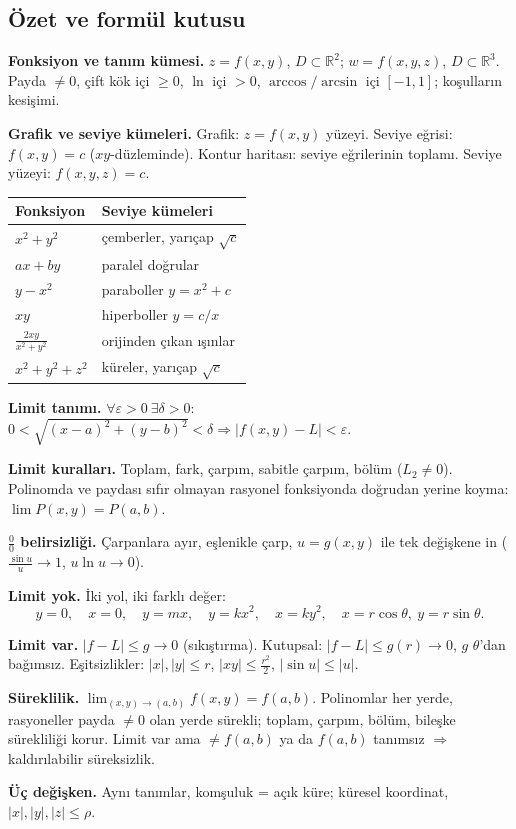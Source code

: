 \subsection{Özet ve formül kutusu}

\begin{ozet}
\textbf{Fonksiyon ve tanım kümesi.} $z=f(x,y)$, $D\subset\mathbb R^2$; $w=f(x,y,z)$, $D\subset\mathbb R^3$.
Payda $\neq0$, çift kök içi $\ge0$, $\ln$ içi $>0$, $\arccos/\arcsin$ içi $[-1,1]$; koşulların kesişimi.

\textbf{Grafik ve seviye kümeleri.} Grafik: $z=f(x,y)$ yüzeyi. Seviye eğrisi: $f(x,y)=c$ ($xy$-düzleminde).
Kontur haritası: seviye eğrilerinin toplamı. Seviye yüzeyi: $f(x,y,z)=c$.

\begin{center}
\begin{tabular}{l l}
\toprule
Fonksiyon & Seviye kümeleri \\
\midrule
$x^2+y^2$ & çemberler, yarıçap $\sqrt c$ \\
$ax+by$ & paralel doğrular \\
$y-x^2$ & paraboller $y=x^2+c$ \\
$xy$ & hiperboller $y=c/x$ \\
$\frac{2xy}{x^2+y^2}$ & orijinden çıkan ışınlar \\
$x^2+y^2+z^2$ & küreler, yarıçap $\sqrt c$ \\
\bottomrule
\end{tabular}
\end{center}

\textbf{Limit tanımı.} $\forall\varepsilon>0\ \exists\delta>0$:
$0<\sqrt{(x-a)^2+(y-b)^2}<\delta\Rightarrow|f(x,y)-L|<\varepsilon$.

\textbf{Limit kuralları.} Toplam, fark, çarpım, sabitle çarpım, bölüm ($L_2\neq0$). Polinomda ve paydası sıfır olmayan
rasyonel fonksiyonda doğrudan yerine koyma: $\lim P(x,y)=P(a,b)$.

\textbf{$\frac00$ belirsizliği.} Çarpanlara ayır, eşlenikle çarp, $u=g(x,y)$ ile tek değişkene in
($\frac{\sin u}{u}\to1$, $u\ln u\to0$).

\textbf{Limit yok.} İki yol, iki farklı değer:
\[
y=0,\quad x=0,\quad y=mx,\quad y=kx^2,\quad x=ky^2,\quad x=r\cos\theta,\ y=r\sin\theta .
\]

\textbf{Limit var.} $|f-L|\le g\to0$ (sıkıştırma). Kutupsal: $|f-L|\le g(r)\to0$, $g$ $\theta$'dan bağımsız.
Eşitsizlikler: $|x|,|y|\le r$, $|xy|\le\frac{r^2}{2}$, $|\sin u|\le|u|$.

\textbf{Süreklilik.} $\lim_{(x,y)\to(a,b)}f(x,y)=f(a,b)$. Polinomlar her yerde, rasyoneller payda $\neq0$ olan yerde
sürekli; toplam, çarpım, bölüm, bileşke sürekliliği korur. Limit var ama $\neq f(a,b)$ ya da $f(a,b)$ tanımsız
$\Rightarrow$ kaldırılabilir süreksizlik.

\textbf{Üç değişken.} Aynı tanımlar, komşuluk = açık küre; küresel koordinat, $|x|,|y|,|z|\le\rho$.
\end{ozet}
